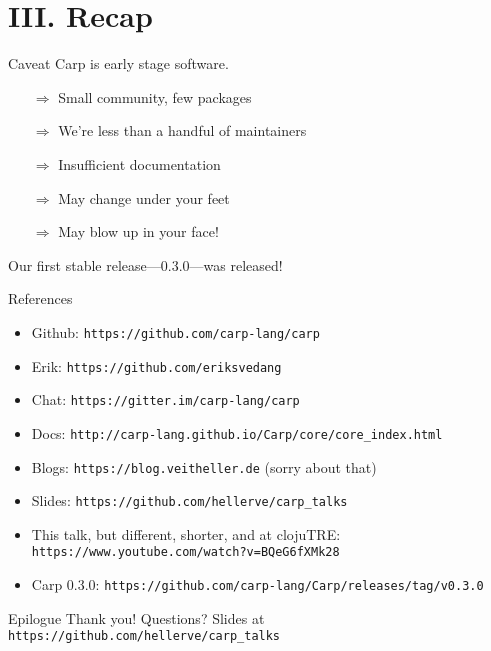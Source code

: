 \documentclass[aspectratio=169]{beamer}
\begin{document}
  \section{III. Recap}
  \begin{frame}{Caveat}
    Carp is early stage software.
    \begin{itemize}
      \item[$\Rightarrow$] Small community, few packages
      \item[$\Rightarrow$] We’re less than a handful of maintainers
      \item[$\Rightarrow$] Insufficient documentation
      \item[$\Rightarrow$] May change under your feet
      \item[$\Rightarrow$] May blow up in your face!
    \end{itemize}
    Our first stable release—0.3.0—was released!
  \end{frame}
  \begin{frame}{References}
    \begin{itemize}
      \item Github: \texttt{https://github.com/carp-lang/carp}
      \item Erik: \texttt{https://github.com/eriksvedang}
      \item Chat: \texttt{https://gitter.im/carp-lang/carp}
      \item Docs: \texttt{http://carp-lang.github.io/Carp/core/core\_index.html}
      \item Blogs: \texttt{https://blog.veitheller.de} (sorry about that)
      \item Slides: \texttt{https://github.com/hellerve/carp\_talks}
      \item This talk, but different, shorter, and at clojuTRE: \texttt{https://www.youtube.com/watch?v=BQeG6fXMk28}
      \item Carp 0.3.0: \texttt{https://github.com/carp-lang/Carp/releases/tag/v0.3.0}
    \end{itemize}
  \end{frame}
  \begin{frame}{Epilogue}
    \Huge Thank you!
    \linebreak
    \linebreak
    \linebreak
    \small Questions?
    \linebreak
    \linebreak
    \tiny Slides at \texttt{https://github.com/hellerve/carp\_talks}
  \end{frame}
\end{document}

